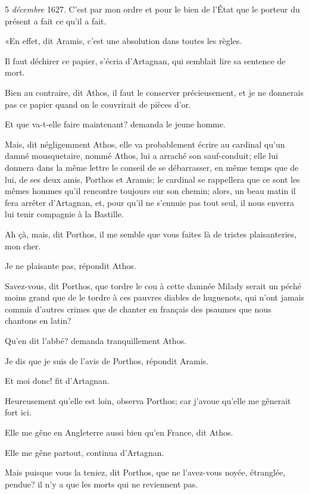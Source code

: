 \begin{mail}{5 \textit{décembre} 1627.}{}
C'est par mon ordre et pour le bien de l'État que le porteur du présent a fait ce qu'il a fait.
\end{mail}

«En effet, dit Aramis, c'est une absolution dans toutes les règles. 

\speak  Il faut déchirer ce papier, s'écria d'Artagnan, qui semblait lire sa sentence de mort. 

\speak  Bien au contraire, dit Athos, il faut le conserver précieusement, et je ne donnerais pas ce papier quand on le couvrirait de pièces d'or. 

\speak  Et que va-t-elle faire maintenant? demanda le jeune homme. 

\speak  Mais, dit négligemment Athos, elle va probablement écrire au cardinal qu'un damné mousquetaire, nommé Athos, lui a arraché son sauf-conduit; elle lui donnera dans la même lettre le conseil de se débarrasser, en même temps que de lui, de ses deux amis, Porthos et Aramis; le cardinal se rappellera que ce sont les mêmes hommes qu'il rencontre toujours sur son chemin; alors, un beau matin il fera arrêter d'Artagnan, et, pour qu'il ne s'ennuie pas tout seul, il nous enverra lui tenir compagnie à la Bastille. 

\speak  Ah çà, mais, dit Porthos, il me semble que vous faites là de tristes plaisanteries, mon cher. 

\speak  Je ne plaisante pas, répondit Athos. 

\speak  Savez-vous, dit Porthos, que tordre le cou à cette damnée Milady serait un péché moins grand que de le tordre à ces pauvres diables de huguenots, qui n'ont jamais commis d'autres crimes que de chanter en français des psaumes que nous chantons en latin? 

\speak  Qu'en dit l'abbé? demanda tranquillement Athos. 

\speak  Je dis que je suis de l'avis de Porthos, répondit Aramis. 

\speak  Et moi donc! fit d'Artagnan. 

\speak  Heureusement qu'elle est loin, observa Porthos; car j'avoue qu'elle me gênerait fort ici. 

\speak  Elle me gêne en Angleterre aussi bien qu'en France, dit Athos. 

\speak  Elle me gêne partout, continua d'Artagnan. 

\speak  Mais puisque vous la teniez, dit Porthos, que ne l'avez-vous noyée, étranglée, pendue? il n'y a que les morts qui ne reviennent pas. 

